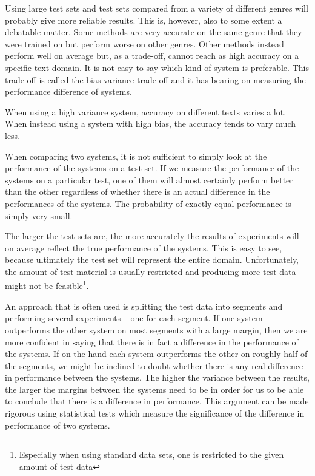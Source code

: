 Using large test sets and test sets compared from a variety of
different genres will probably give more reliable results. This is,
however, also to some extent a debatable matter. Some methods are very
accurate on the same genre that they were trained on but perform worse
on other genres. Other methods instead perform well on average but, as
a trade-off, cannot reach as high accuracy on a specific text
domain. It is not easy to say which kind of system is preferable. This
trade-off is called the bias variance trade-off \cite{?} and it has
bearing on measuring the performance difference of systems. 

When using a high variance system, accuracy on different texts varies
a lot. When instead using a system with high bias, the accuracy tends
to vary much less.

When comparing two systems, it is not sufficient to simply look at the
performance of the systems on a test set. If we measure the
performance of the systems on a particular test, one of them will
almost certainly perform better than the other regardless of whether
there is an actual difference in the performances of the systems. The
probability of exactly equal performance is simply very small. 

The larger the test sets are, the more accurately the results of
experiments will on average reflect the true performance of the
systems. This is easy to see, because ultimately the test set will represent the entire domain. Unfortunately, the amount of test material is usually
restricted and producing more test data might not be
feasible\footnote{Especially when using standard data sets, one is
  restricted to the given amount of test data}.

An approach that is often used is splitting the test data into
segments and performing several experiments -- one for each
segment. If one system outperforms the other system on most segments
with a large margin, then we are more confident in saying that there
is in fact a difference in the performance of the systems. If on the
hand each system outperforms the other on roughly half of the
segments, we might be inclined to doubt whether there is any real
difference in performance between the systems. The higher the variance
between the results, the larger the margins between the systems need
to be in order for us to be able to conclude that there is a
difference in performance. This argument can be made rigorous using
statistical tests which measure the significance of the difference in
performance of two systems.

